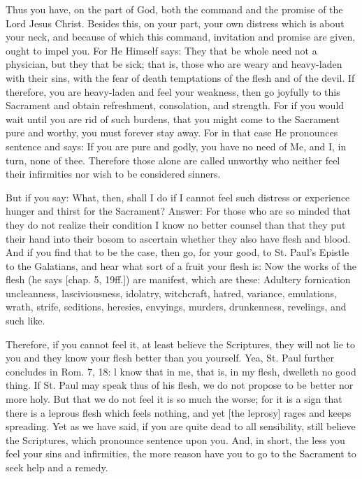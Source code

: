 Thus you have, on the part of God, both the command and the promise of
the Lord Jesus Christ. Besides this, on your part, your own distress
which is about your neck, and because of which this command, invitation
and promise are given, ought to impel you. For He Himself says: They
that be whole need not a physician, but they that be sick; that is,
those who are weary and heavy-laden with their sins, with the fear of
death temptations of the flesh and of the devil. If therefore, you are
heavy-laden and feel your weakness, then go joyfully to this Sacrament
and obtain refreshment, consolation, and strength. For if you would
wait until you are rid of such burdens, that you might come to the
Sacrament pure and worthy, you must forever stay away. For in that case
He pronounces sentence and says: If you are pure and godly, you have no
need of Me, and I, in turn, none of thee. Therefore those alone are
called unworthy who neither feel their infirmities nor wish to be
considered sinners.

But if you say: What, then, shall I do if I cannot feel such distress
or experience hunger and thirst for the Sacrament? Answer: For those
who are so minded that they do not realize their condition I know no
better counsel than that they put their hand into their bosom to
ascertain whether they also have flesh and blood. And if you find that
to be the case, then go, for your good, to St. Paul's Epistle to the
Galatians, and hear what sort of a fruit your flesh is: Now the works
of the flesh (he says [chap. 5, 19ff.]) are manifest, which are these:
Adultery fornication uncleanness, lasciviousness, idolatry, witchcraft,
hatred, variance, emulations, wrath, strife, seditions, heresies,
envyings, murders, drunkenness, revelings, and such like.

Therefore, if you cannot feel it, at least believe the Scriptures, they
will not lie to you and they know your flesh better than you yourself.
Yea, St. Paul further concludes in Rom. 7, 18: l know that in me, that
is, in my flesh, dwelleth no good thing. If St. Paul may speak thus of
his flesh, we do not propose to be better nor more holy. But that we do
not feel it is so much the worse; for it is a sign that there is a
leprous flesh which feels nothing, and yet [the leprosy] rages and
keeps spreading. Yet as we have said, if you are quite dead to all
sensibility, still believe the Scriptures, which pronounce sentence
upon you. And, in short, the less you feel your sins and infirmities,
the more reason have you to go to the Sacrament to seek help and a
remedy.

